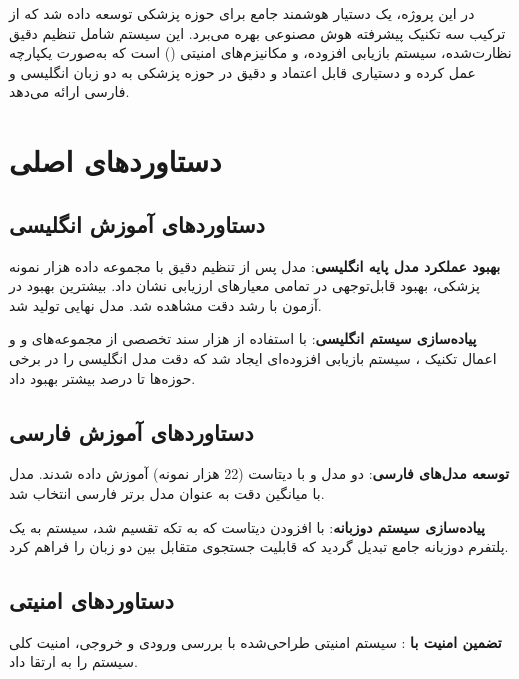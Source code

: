 \documentclass[11pt, a4paper, oneside]{book}
\begin{document}
	در این پروژه، یک دستیار هوشمند جامع برای حوزه پزشکی توسعه داده شد که از ترکیب سه تکنیک پیشرفته هوش مصنوعی بهره می‌برد. این سیستم شامل تنظیم دقیق نظارت‌شده، سیستم بازیابی افزوده، و مکانیزم‌های امنیتی () است که به‌صورت یکپارچه عمل کرده و دستیاری قابل اعتماد و دقیق در حوزه پزشکی به دو زبان انگلیسی و فارسی ارائه می‌دهد.

	\section{دستاوردهای اصلی}

	\subsection{دستاوردهای آموزش انگلیسی}

	\textbf{بهبود عملکرد مدل پایه انگلیسی}: مدل  پس از تنظیم دقیق با مجموعه داده  هزار نمونه پزشکی، بهبود قابل‌توجهی در تمامی معیارهای ارزیابی نشان داد. بیشترین بهبود در آزمون  با  رشد دقت مشاهده شد. مدل نهایی  تولید شد.

	\textbf{پیاده‌سازی سیستم  انگلیسی}: با استفاده از  هزار سند تخصصی از مجموعه‌های  و  و اعمال تکنیک ، سیستم بازیابی افزوده‌ای ایجاد شد که دقت مدل انگلیسی را در برخی حوزه‌ها تا  درصد بیشتر بهبود داد.

	\subsection{دستاوردهای آموزش فارسی}

	\textbf{توسعه مدل‌های فارسی}: دو مدل  و  با دیتاست  (22 هزار نمونه) آموزش داده شدند. مدل  با میانگین دقت  به عنوان مدل برتر فارسی انتخاب شد.

	\textbf{پیاده‌سازی سیستم  دوزبانه}: با افزودن دیتاست  که به  تکه تقسیم شد، سیستم  به یک پلتفرم دوزبانه جامع تبدیل گردید که قابلیت جستجوی متقابل بین دو زبان را فراهم کرد.

	\subsection{دستاوردهای امنیتی}

	\textbf{تضمین امنیت با }: سیستم امنیتی طراحی‌شده با بررسی ورودی و خروجی، امنیت کلی سیستم را به ارتقا داد.
\end{document}
